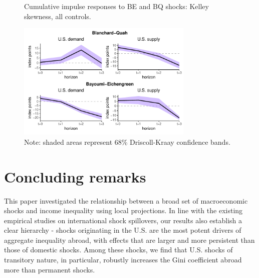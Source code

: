 \documentclass[12pt, a4paper]{article}
\begin{document}
\begin{figure}[H]
    \centering    
    \caption{Cumulative impulse responses to BE and BQ shocks: Kelley skewness, all controls.}  
    \label{fig:bqbe_kelley}
    \includegraphics[width=0.75\textwidth]{Figures/robust_kelley_BQBE_demand_supply_LP.pdf}
    \centering \caption*{Note: shaded areas represent 68\% Driscoll-Kraay confidence bands.}
\end{figure}

\section{Concluding remarks}
This paper investigated the relationship between a broad set of macroeconomic shocks and income inequality using local projections. In line with the existing empirical studies on international shock spillovers, our results also establish a clear hierarchy - shocks originating in the U.S. are the most potent drivers of aggregate inequality abroad, with effects that are larger and more persistent than those of domestic shocks. Among these shocks, we find that U.S. shocks of transitory nature, in particular, robustly increases the Gini coefficient abroad more than permanent shocks.
\end{document}
